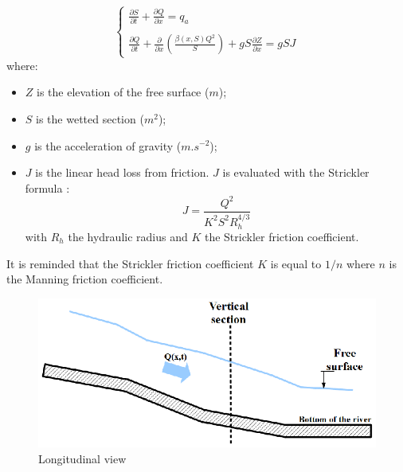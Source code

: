 \begin{equation}
 \label{SVT2}
 \left \lbrace
  \begin{array}{l}
    \frac{\partial S}{\partial t} + \frac{\partial Q}{\partial x} = q_a \\
    \\
    \frac{\partial Q}{\partial t} + \frac{\partial}{\partial x} \left ( \frac{\beta(x,S) Q^2}{S}\right ) + g S \frac{\partial Z}{\partial x} = g S J
  \end{array}
 \right.
\end{equation}
where:
\begin{itemize}
 \item $Z$ is the elevation of the free surface ($m$);
 \item $S$ is the wetted section ($m^2$);
 \item $g$ is the acceleration of gravity ($m.s^{-2}$);
 \item $J$ is the linear head loss from friction. $J$ is evaluated with the Strickler formula :
  \begin{equation}
    J = \frac{Q^2}{K^2 S^2 R_{h}^{4/3}}
  \end{equation}
  with $R_h$ the hydraulic radius and $K$ the Strickler friction coefficient.
\end{itemize}


It is reminded that the Strickler friction coefficient $K$ is equal to $1/n$ where $n$ is the Manning friction coefficient.

\begin{figure}
 \begin{center}
  \includegraphics[scale=1.3]{Figures/VueLong.eps}
  \caption{Longitudinal view}
 \end{center}
\end{figure}

